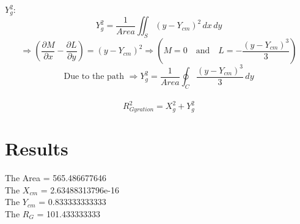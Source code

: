 \documentclass[a4paper]{article}
\begin{document}
$Y_{g}^2$:
$$Y_{g}^2 =\frac{1}{Area}\iint_S (y-Y_{cm})^2 \,dx\,dy$$
$$\Longrightarrow (\frac{\partial M}{\partial x}-\frac{\partial L}{\partial y}) = (y-Y_{cm})^2 \Longrightarrow (M=0 \quad \textrm{and} \quad L=-\frac{(y-Y_{cm})^3}{3} )$$ 
$$\textrm{Due to the path }\Longrightarrow Y_{g}^2 = \frac{1}{Area}\oint_C  \frac{(y-Y_{cm})^3}{3}\,dy $$\\

$$R_{Gyration}^2 = X_{g}^2+Y_{g}^2$$



\section{Results}

The Area = 565.486677646 \\
The $X_{cm}$ = 2.63488313796e-16 \\
The $Y_{cm}$ = 0.833333333333 \\
The $R_{G}$ = 101.433333333 \\
\end{document}
